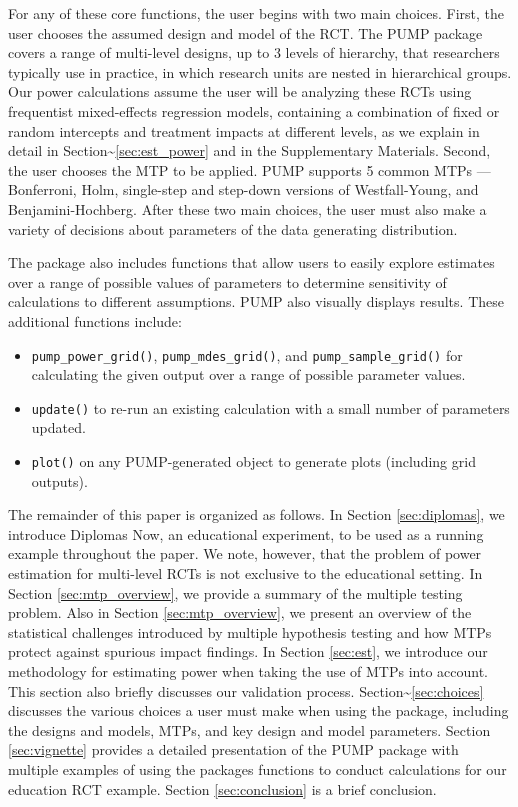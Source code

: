 \documentclass[
]{article}
\providecommand{\tightlist}{%
  \setlength{\itemsep}{0pt}\setlength{\parskip}{0pt}}
\begin{document}
For any of these core functions, the user begins with two main choices.
First, the user chooses the assumed design and model of the RCT. The
PUMP package covers a range of multi-level designs, up to 3 levels of
hierarchy, that researchers typically use in practice, in which research
units are nested in hierarchical groups. Our power calculations assume
the user will be analyzing these RCTs using frequentist mixed-effects
regression models, containing a combination of fixed or random
intercepts and treatment impacts at different levels, as we explain in
detail in Section\textasciitilde{}\ref{sec:est_power} and in the
Supplementary Materials. Second, the user chooses the MTP to be applied.
PUMP supports 5 common MTPs --- Bonferroni, Holm, single-step and
step-down versions of Westfall-Young, and Benjamini-Hochberg. After
these two main choices, the user must also make a variety of decisions
about parameters of the data generating distribution.

The package also includes functions that allow users to easily explore
estimates over a range of possible values of parameters to determine
sensitivity of calculations to different assumptions. PUMP also visually
displays results. These additional functions include:

\begin{itemize}
\tightlist
\item
  \texttt{pump\_power\_grid()}, \texttt{pump\_mdes\_grid()}, and
  \texttt{pump\_sample\_grid()} for calculating the given output over a
  range of possible parameter values.
\item
  \texttt{update()} to re-run an existing calculation with a small
  number of parameters updated.
\item
  \texttt{plot()} on any PUMP-generated object to generate plots
  (including grid outputs).
\end{itemize}

The remainder of this paper is organized as follows. In Section
\ref{sec:diplomas}, we introduce Diplomas Now, an educational
experiment, to be used as a running example throughout the paper. We
note, however, that the problem of power estimation for multi-level RCTs
is not exclusive to the educational setting. In Section
\ref{sec:mtp_overview}, we provide a summary of the multiple testing
problem. Also in Section \ref{sec:mtp_overview}, we present an overview
of the statistical challenges introduced by multiple hypothesis testing
and how MTPs protect against spurious impact findings. In Section
\ref{sec:est}, we introduce our methodology for estimating power when
taking the use of MTPs into account. This section also briefly discusses
our validation process. Section\textasciitilde{}\ref{sec:choices}
discusses the various choices a user must make when using the package,
including the designs and models, MTPs, and key design and model
parameters. Section \ref{sec:vignette} provides a detailed presentation
of the PUMP package with multiple examples of using the packages
functions to conduct calculations for our education RCT example. Section
\ref{sec:conclusion} is a brief conclusion.
\end{document}
